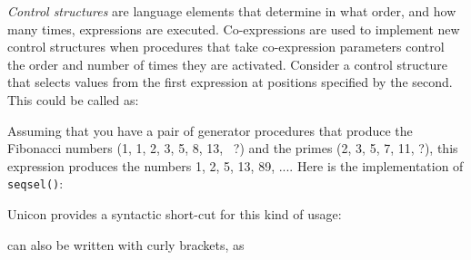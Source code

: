 \textit{Control structures} are language elements
that determine in what order, and how many times, expressions
are executed. Co-expressions are used to implement new
control structures when procedures that take
co-expression parameters control the order and number
of times they are activated.
Consider a control structure that selects values from the first
expression at positions specified by the second. This could be
called as:


Assuming that you have a pair of generator procedures
that produce the Fibonacci numbers (1, 1, 2, 3, 5, 8, 13, \ ?) and the
primes (2, 3, 5, 7, 11, ?), this expression produces the numbers 1, 2,
5, 13, 89, .... Here is the implementation of \texttt{seqsel()}:


\noindent
Unicon provides a syntactic short-cut for this kind of usage:


\noindent
can also be written with curly brackets, as


